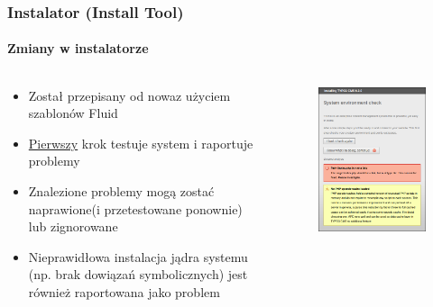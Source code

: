 \begin{frame}[fragile]
	\frametitle{Instalator (Install Tool)}
	\framesubtitle{Zmiany w instalatorze}

	\begin{columns}[T]

		\begin{column}{.5\textwidth}
			\begin{itemize}
				\item Został przepisany od nowa\newline z użyciem szablonów Fluid
				\item \underline{Pierwszy} krok testuje system i raportuje problemy
				\item Znalezione problemy mogą zostać naprawione\newline (i przetestowane ponownie) lub zignorowane
				\item Nieprawidłowa instalacja jądra systemu (np. brak dowiązań symbolicznych) jest również raportowana jako problem
			\end{itemize}
		\end{column}

		\begin{column}{.5\textwidth}
			\begin{figure}\vspace*{-0.4cm}
				\includegraphics[width=0.8\linewidth]{Images/InstallTool/SystemEnvironmentCheck.png}
			\end{figure}
		\end{column}

	\end{columns}

\end{frame}

